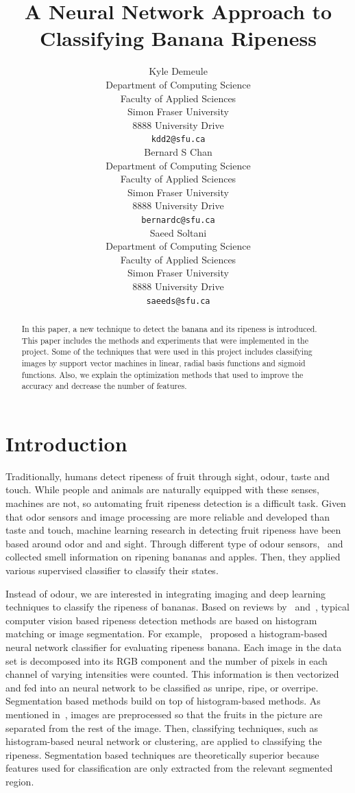 \documentclass{article} %
\title{A Neural Network Approach to Classifying Banana Ripeness}
\author{
Kyle Demeule\\
Department of Computing Science\\
Faculty of Applied Sciences\\
Simon Fraser University\\
8888 University Drive\\
\texttt{kdd2@sfu.ca} \\
\And
Bernard S Chan \\
Department of Computing Science\\
Faculty of Applied Sciences\\
Simon Fraser University\\
8888 University Drive\\
\texttt{bernardc@sfu.ca} \\
\AND
Saeed Soltani\\
Department of Computing Science\\Faculty of Applied Sciences\\
Simon Fraser University\\
8888 University Drive\\
\texttt{saeeds@sfu.ca} \\
}
\begin{document}
\maketitle

\begin{abstract}
In this paper, a new technique to detect the banana and its ripeness is introduced. This paper includes the methods and experiments that were implemented in the project. Some of the techniques that were used in this project includes classifying images by support vector machines in linear, radial basis functions and sigmoid functions. Also, we explain the optimization methods that used to improve the accuracy and decrease the number of features.\end{abstract}

\section{Introduction}

Traditionally, humans detect ripeness of fruit  through sight, odour, taste and touch. While people and animals are naturally equipped with these senses, machines are not, so automating fruit ripeness detection is a difficult task. Given that odor sensors and image processing are more reliable and developed than taste and touch, machine learning research in detecting fruit ripeness have been based around odor and and sight.  Through different type of odour sensors,~\citet{llobet1999non} and~\citet{li2007neural} collected smell information on ripening bananas and apples. Then, they applied various supervised classifier to classify their states.

Instead of odour, we are interested in integrating imaging and deep learning techniques to classify the ripeness of bananas. Based on reviews by~\citet{dadwal2012color} and~\citet{kodagali2012computer}, typical computer vision based ripeness detection methods are based on histogram matching or image segmentation. For example,~\citet{paulraj2009color} proposed a histogram-based neural network classifier for evaluating ripeness banana. Each image in the data set is decomposed into its RGB component and the number of pixels in each channel of varying intensities were counted. This information is then vectorized and fed into an neural network to be classified as unripe, ripe, or overripe. Segmentation based methods build on top of histogram-based methods. As mentioned in~\citet{dadwal2012color}, images are preprocessed so that the fruits in the picture are separated from the rest of the image. Then, classifying techniques, such as histogram-based neural network or clustering, are applied to classifying the ripeness. Segmentation based techniques are theoretically superior because features used for classification are only extracted from the relevant segmented region. 
\end{document}
